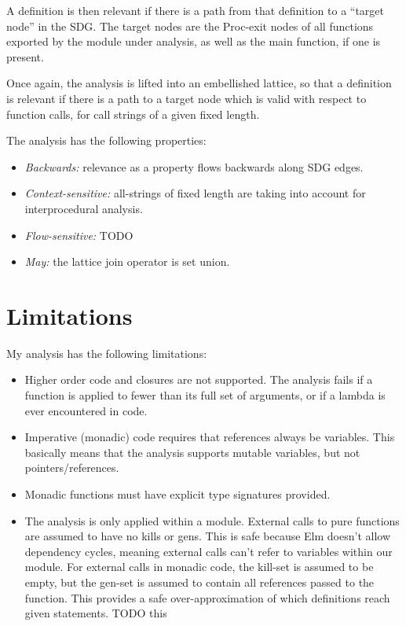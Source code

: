 \documentclass{article}
\begin{document}
A definition is then relevant if there is a path from that definition to a ``target node'' in the SDG. The target nodes are the Proc-exit nodes of all functions exported by the module under analysis, as well as the main function, if one is present.

Once again, the analysis is lifted into an embellished lattice, so that a definition is relevant if there is a path to a target node which is valid with respect to function calls, for call strings of a given fixed length.

The analysis has the following properties:

\begin{itemize}
\item \textit{Backwards:} relevance as a property flows backwards along SDG edges.
\item \textit{Context-sensitive:} all-strings of fixed length are taking into account for interprocedural analysis.
\item \textit{Flow-sensitive:} TODO
\item \textit{May:} the lattice join operator is set union.
\end{itemize}



\section{Limitations}

My analysis has the following limitations:

\begin{itemize}
\item
  Higher order code and closures are not supported. The analysis fails if a function is applied to fewer than its full set of arguments, or if a lambda is ever encountered in code.
\item
  Imperative (monadic) code requires that references always be variables. This basically means that the analysis supports mutable variables, but not pointers/references.
\item Monadic functions must have explicit type signatures provided.
\item
  The analysis is only applied within a module. External calls to pure functions are assumed to have no kills or gens. This is safe because Elm doesn't allow dependency cycles, meaning external calls can't refer to variables within our module. For external calls in monadic code, the kill-set is assumed to be empty, but the gen-set is assumed to contain all references passed to the function. This provides a safe over-approximation of which definitions reach given statements. TODO this
\end{itemize}
\end{document}
